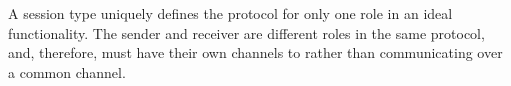 A session type uniquely defines the protocol for only one role in an ideal functionality.
The sender and receiver are different roles in the same protocol, and, therefore, must have their own channels to \Fcom rather than communicating over a common channel.


%

